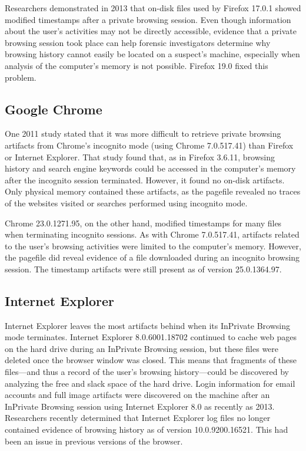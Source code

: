 \documentclass[pdftex,letterpaper,titlepage,12pt]{article}
\begin{document}
    Researchers demonstrated in 2013 that on-disk files used by Firefox 17.0.1 
    showed modified timestamps after a private browsing session. Even though
    information about the user's activities may not be directly accessible,
    evidence that a private browsing session took place can help forensic
    investigators determine why browsing history cannot easily be located on a
    suspect's machine, especially when analysis of the computer's memory is not
    possible.\cite{ohana13} Firefox 19.0 fixed this problem.\cite{satvat13}

    \subsection{Google Chrome}
    One 2011 study stated that it was more difficult to retrieve private
    browsing artifacts from Chrome's incognito mode (using Chrome 7.0.517.41) 
    than Firefox or Internet Explorer. That study found that, as in Firefox 
    3.6.11, browsing history and search engine keywords could be accessed in 
    the computer's memory after the incognito session terminated. However, it 
    found no on-disk artifacts. Only physical memory contained these artifacts, 
    as the pagefile revealed no traces of the websites visited or searches 
    performed using incognito mode.\cite{said11}
    
    Chrome 23.0.1271.95, on the other hand, modified timestamps for many files
    when terminating incognito sessions. As with Chrome 7.0.517.41, artifacts 
    related to the user's browsing activities were limited to the computer's 
    memory. However, the pagefile did reveal evidence of a file downloaded
    during an incognito browsing session.\cite{ohana13} The timestamp artifacts
    were still present as of version 25.0.1364.97.\cite{satvat13}
    
    \subsection{Internet Explorer}
    Internet Explorer leaves the most artifacts behind when its InPrivate
    Browsing mode terminates.\cite{ohana13} Internet Explorer 8.0.6001.18702
    continued to cache web pages on the hard drive during an InPrivate
    Browsing session, but these files were deleted once the browser window was
    closed. This means that fragments of these files---and thus a record of the
    user's browsing history---could be discovered by analyzing the free and
    slack space of the hard drive.\cite{said11} Login information for email
    accounts and full image artifacts were discovered on the machine after an 
    InPrivate Browsing session using Internet Explorer 8.0 as recently as 2013.
    \cite{ohana13} Researchers recently determined that Internet Explorer log 
    files no longer contained evidence of browsing history as of version 
    10.0.9200.16521. This had been an issue in previous versions of the 
    browser.\cite{satvat13}
\end{document}
